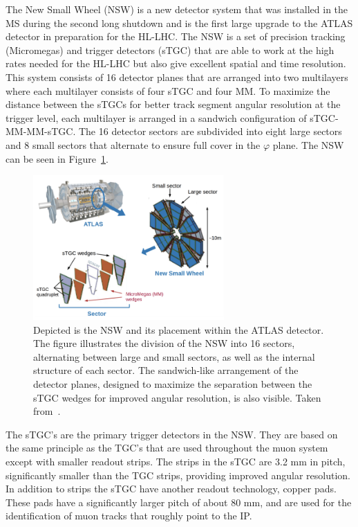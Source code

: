 The New Small Wheel (NSW) is a new detector system that was installed in the MS during the second long shutdown and is the first large upgrade to the ATLAS detector in preparation for the HL-LHC\@. The NSW is a set of precision tracking (Micromegas) and trigger detectors (sTGC) that are able to work at the high rates needed for the HL-LHC but also give excellent spatial and time resolution. This system consists of 16 detector planes that are arranged into two multilayers where each multilayer consists of four sTGC and four MM\@. To maximize the distance between the sTGCs for better track segment angular resolution at the trigger level, each multilayer is arranged in a sandwich configuration of sTGC-MM-MM-sTGC\@. The 16 detector sectors are subdivided into eight large sectors and 8 small sectors that alternate to ensure full cover in the $\varphi$ plane. The NSW can be seen in Figure~\ref{fig:atlas_nsw}.

\begin{figure}[htp]
    \centering
    \includegraphics[width=0.65\textwidth]{figures/atlas/atlas_NSW.png}
    \caption{Depicted is the NSW and its placement within the ATLAS detector. The figure illustrates the division of the NSW into 16 sectors, alternating between large and small sectors, as well as the internal structure of each sector. The sandwich-like arrangement of the detector planes, designed to maximize the separation between the sTGC wedges for improved angular resolution, is also visible. Taken from~\cite{NSW_image}.}\label{fig:atlas_nsw}
\end{figure}

The sTGC's are the primary trigger detectors in the NSW\@. They are based on the same principle as the TGC's that are used throughout the muon system except with smaller readout strips. The strips in the sTGC are 3.2 mm in pitch, significantly smaller than the TGC strips, providing improved angular resolution. In addition to strips the sTGC have another readout technology, copper pads. These pads have a significantly larger pitch of about 80 mm, and are used for the identification of muon tracks that roughly point to the IP\@.

